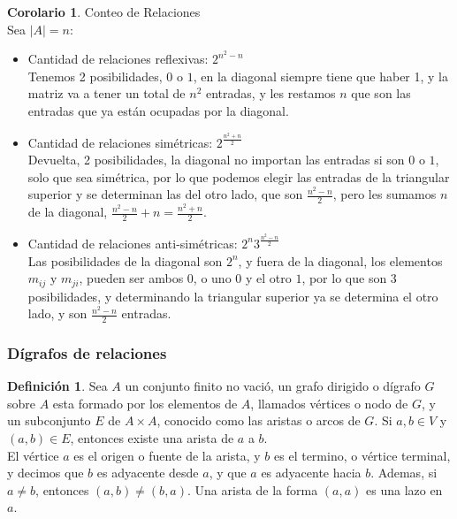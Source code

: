 \documentclass[10pt]{article}
\theoremstyle{definition}
\newtheorem{definition}{Definición}[section]
\newtheorem{corollary}{Corolario}[theorem]
\begin{document}
\begin{corollary}{Conteo de Relaciones}
	\\Sea $|A|=n$:
	\begin{itemize}
		\item Cantidad de relaciones reflexivas: $2^{n^2-n}$\\Tenemos 2 posibilidades, $0$ o $1$, en la diagonal siempre tiene que haber 1, y la matriz va a tener un total de $n^2$ entradas, y les restamos $n$ que son las entradas que ya están ocupadas por la diagonal.
		\item Cantidad de relaciones simétricas: $2^{\frac{n^2+n}{2}}$\\Devuelta, 2 posibilidades, la diagonal no importan las entradas si son $0$ o $1$, solo que sea simétrica, por lo que podemos elegir las entradas de la triangular superior y se determinan las del otro lado, que son $\frac{n^2-n}{2}$, pero les sumamos $n$ de la diagonal, $\frac{n^2-n}{2}+n=\frac{n^2+n}{2}$.
		\item Cantidad de relaciones anti-simétricas: $2^n3^{\frac{n^2-n}{2}}$\\Las posibilidades de la diagonal son $2^n$, y fuera de la diagonal, los elementos $m_{ij}$ y $m_{ji}$, pueden ser ambos $0$, o uno $0$ y el otro $1$, por lo que son 3 posibilidades, y determinando la triangular superior ya se determina el otro lado, y son $\frac{n^2-n}{2}$ entradas.
	\end{itemize}
\end{corollary}
\subsubsection{Dígrafos de relaciones}
\begin{definition}
	Sea $A$ un conjunto finito no vació, un grafo dirigido o dígrafo $G$ sobre $A$ esta formado por los elementos de $A$, llamados vértices o nodo de $G$, y un subconjunto $E$ de $A\times A$, conocido como las aristas o arcos de $G$. Si $a,b\in V$ y $(a,b)\in E$, entonces existe una arista de $a$ a $b$.\\El vértice $a$ es el origen o fuente de la arista, y $b$ es el termino, o vértice terminal, y decimos que $b$ es adyacente desde $a$, y que $a$ es adyacente hacia $b$. Ademas, si $a\neq b$, entonces $(a,b)\neq(b,a)$. Una arista de la forma $(a,a)$ es una lazo en $a$.
\end{definition}
\end{document}

